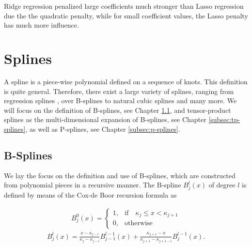 \documentclass[10pt,a4paper]{report}
\begin{document}
Ridge regression penalized large coefficients much stronger than Lasso regression due the the quadratic penalty, while for small coefficient values, the Lasso penalty has much more influence. \cite{tibshirani1996lasso}

\section{Splines} \label{sec:Splines}
	
A spline is a piece-wise polynomial defined on a sequence of knots. This definition is quite general. Therefore, there exist a large variety of splines, ranging from regression splines \cite{eubank1990regressionsplines}, over B-splines \cite{deBoor1978practicalGuideToSplines} to natural cubic splines and many more. We will focus on the definition of B-splines, see Chapter \ref{subsec:b-splines}, and tensor-product splines as the multi-dimensional expansion of B-splines, see Chapter \ref{subsec:tp-splines}, as well as P-splines, see Chapter \ref{subsec:p-splines}. \cite{deBoor1978practicalGuideToSplines} \cite{eilers1996flexible}
\subsection{B-Splines} \label{subsec:b-splines}


We lay the focus on the definition and use of B-splines, which are constructed from polynomial pieces in a recursive manner. The B-spline $B_j^l(x)$ of degree $l$ is defined by means of the Cox-de Boor recursion formula as

\begin{align} \label{eq:Bspline_recDef1}
	B_j^0(x) = \begin{cases} 1, & \text{if} \quad \kappa_j \le x < \kappa_{j+1} \\ 
					 		 0, & \text{otherwise} 
	\end{cases}
\end{align}
\begin{align} \label{eq:Bspline_recDef2}
	B_j^l(x) = \frac{x - \kappa_{j-l}}{\kappa_{j} - \kappa_{j-l}} B_{j-1}^{l-1}(x) + \frac{\kappa_{j+1} - x}{\kappa_{j+1} - \kappa_{j+1-l}} B_{j}^{l-1}(x).
\end{align}
\end{document}
